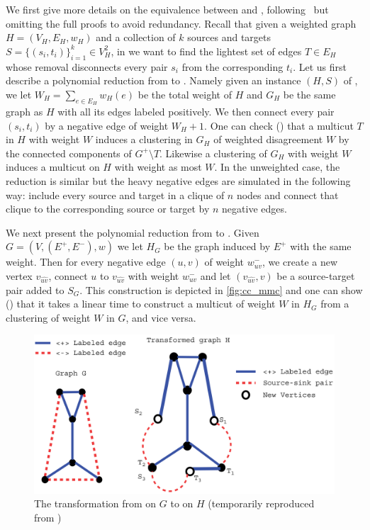 We first give more details on the equivalence between \mmc{} and \pcc{},
following~\autocite{Demaine2006} but omitting the full proofs to avoid redundancy. Recall that given
a weighted graph $H=(V_H, E_H, w_H)$ and a collection of $k$ sources and targets
$S=\{(s_i,t_i)\}_{i=1}^k \in V_H^2$, in \mmc{} we want to find the lightest set of edges $T\in E_H$
whose removal disconnects every pair $s_i$ from the corresponding $t_i$. Let us first describe a
polynomial reduction from \mmc{} to \pcc{}. Namely given an instance $(H, S)$ of \mmc{}, we let
$W_H=\sum_{e\in E_H} w_H(e)$ be the total weight of $H$ and $G_H$ be the same graph as $H$ with all
its edges labeled positively. We then connect every pair $(s_i, t_i)$ by a negative edge of weight
$W_H+1$. One can check (\autocite[Theorem 4.7]{Demaine2006}) that a multicut $T$ in $H$ with weight
$W$ induces a clustering in $G_H$ of weighted disagreement $W$ by the connected components of
$G^+\setminus T$. Likewise a clustering of $G_H$ with weight $W$ induces a multicut on $H$ with
weight as most $W$. In the unweighted case, the reduction is similar but the heavy negative edges
are simulated in the following way: include every source and target in a clique of $n$ nodes and
connect that clique to the corresponding source or target by $n$ negative edges.

We next present the polynomial reduction from \pcc{} to \mmc{}. Given $G=(V, (E^+, E^-), w)$ we let
$H_G$ be the graph induced by $E^+$ with the same weight. Then for every negative edge $(u,v)$ of
weight $w_{uv}^-$, we create a new vertex $v_{\widehat{uv}}$, connect $u$ to $v_{\widehat{uv}}$ with
weight $w_{uv}^-$ and let $(v_{\widehat{uv}}, v)$ be a source-target pair added to $S_G$. This
construction is depicted in \autoref{fig:cc_mmc} and one can show (\autocite[Theorem
4.4]{Demaine2006}) that it takes a linear time to construct a
multicut of weight $W$ in $H_G$ from a clustering of weight $W$ in $G$, and vice versa.

\begin{figure}[htpb]
   \centering
   \includegraphics[width=0.8\linewidth]{assets/raw/cc_to_mmc.png}
   \caption{The transformation from \pcc{} on $G$ to \mmc{} on $H$ (temporarily reproduced from
   \autocite{Demaine2006}) \label{fig:cc_mmc}}
\end{figure}


